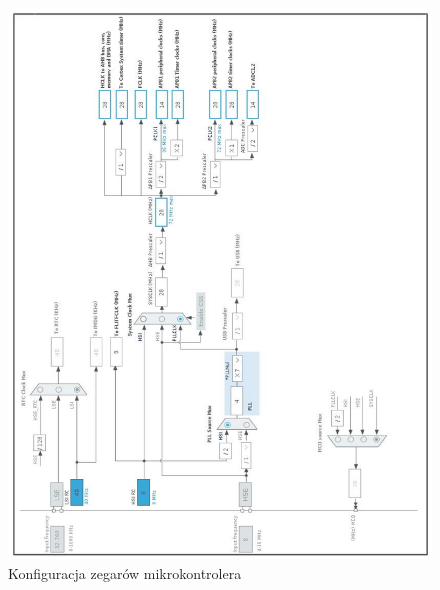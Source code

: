 \documentclass[10pt, a4paper]{article}
\begin{document}
\newpage
\begin{figure}[H]
	\centering
	\includegraphics[width=\textwidth]{konfiguracja_clk.png}
	\caption{Konfiguracja zegarów mikrokontrolera}
	\label{fig:KonfiguracjaZegara}
\end{figure}

\end{document}

